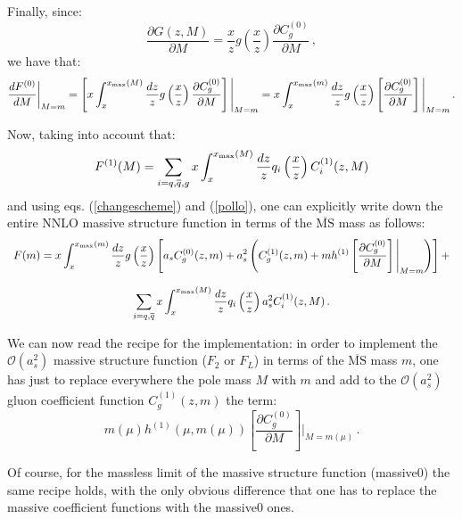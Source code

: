 \documentclass[10pt,a4paper]{article}
\begin{document}
Finally, since:
\begin{equation}
\frac{\partial G(z,M)}{\partial M} = \frac{x}{z}g\left(\frac{x}{z}\right)\frac{\partial C_g^{(0)}}{\partial M}\,,
\end{equation}
we have that:
\begin{equation}\label{pollo}
\frac{dF^{(0)}}{dM}\bigg|_{M=m}=\left[x\int_x^{x_{\mbox{\tiny max}}(M)}\frac{dz}{z}g\left(\frac{x}{z}\right)\frac{\partial C_g^{(0)}}{\partial M}\right]\Bigg|_{M=m}=x\int_x^{x_{\mbox{\tiny max}}(m)}\frac{dz}{z}g\left(\frac{x}{z}\right)\left[\frac{\partial C_g^{(0)}}{\partial M}\right]\Bigg|_{M=m}\,.
\end{equation}

Now, taking into account that:
\begin{equation}
F^{(1)}(M) = \sum_{i=q,\overline{q},g}x\int_x^{x_{\mbox{\tiny max}}(M)} \frac{dz}{z}q_i\left(\frac{x}{z}\right)C_i^{(1)}(z,M)
\end{equation}
and using eqs. (\ref{changescheme}) and (\ref{pollo}), one can explicitly write down the entire NNLO massive structure function in terms of the $\overline{\mbox{MS}}$ mass as follows:
\begin{equation}\label{master}
\begin{array}{c}
\displaystyle F(m) = x\int_x^{x_{\mbox{\tiny max}}(m)} \frac{dz}{z}g\left(\frac{x}{z}\right)\left[a_sC_g^{(0)}(z,m)+a_s^2\left(C_g^{(1)}(z,m)+mh^{(1)}\left[\frac{\partial C_g^{(0)}}{\partial M}\right]\Bigg|_{M=m}\right)\right]+\\
\\
\displaystyle \sum_{i=q,\overline{q}}x\int_x^{x_{\mbox{\tiny max}}(M)} \frac{dz}{z}q_i\left(\frac{x}{z}\right)a_s^2C_i^{(1)}(z,M)\,.
\end{array}
\end{equation}

We can now read the recipe for the implementation: in order to implement the $\mathcal{O}(a_s^2)$ massive structure function ($F_2$ or $F_L$) in terms of the $\overline{\mbox{MS}}$ mass $m$, one has just to replace everywhere the pole mass $M$ with $m$ and add to the $\mathcal{O}(a_s^2)$ gluon coefficient function $C_g^{(1)}(z,m)$ the term:
\begin{equation}
m(\mu)h^{(1)}(\mu,m(\mu))\left[\frac{\partial C_g^{(0)}}{\partial M}\right]\Bigg|_{M=m(\mu)}\,.
\end{equation}

Of course, for the massless limit of the massive structure function (massive0) the same recipe holds, with the only obvious difference that one has to replace the massive coefficient functions with the massive0 ones.
\end{document}

